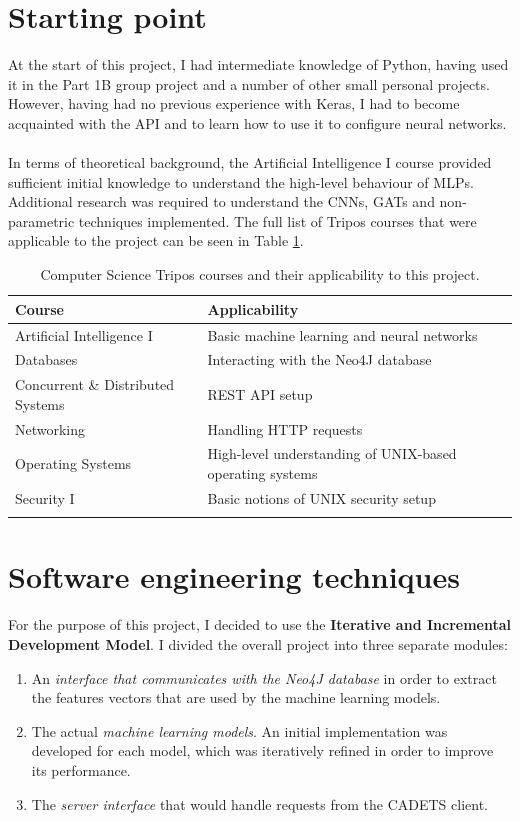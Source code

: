 	\section{Starting point} \label{Section 2.6}
	At the start of this project, I had intermediate knowledge of Python, having used it in the Part 1B group project and a number of other small personal projects. However, having had no previous experience with Keras, I had to become acquainted with the API and to learn how to use it to configure neural networks.   
	\\ \\
	In terms of theoretical background, the Artificial Intelligence I course provided sufficient initial knowledge to understand the high-level behaviour of MLPs. Additional research was required to understand the CNNs, GATs and non-parametric techniques implemented. The full list of Tripos courses that were applicable to the project can be seen in Table \ref{Table 2.4}.
	
	\begin{longtable}{|p{} | p{}|}
		\textbf{Course} & \textbf{Applicability} \\ 
		\hline
		Artificial Intelligence I & Basic machine learning and neural networks \\
		Databases & Interacting with the Neo4J database \\
		Concurrent \& Distributed Systems & REST API setup \\ 
		Networking & Handling HTTP requests \\
		Operating Systems & High-level understanding of UNIX-based operating systems\\
		Security I & Basic notions of UNIX security setup \\
		\hline
		\caption[Computer Science Tripos courses and their applicability to this project.]{\centering Computer Science Tripos courses and their applicability to this project.}
		\label{Table 2.4}
	\end{longtable}
	
	\section{Software engineering techniques} \label{Section 2.7}
	For the purpose of this project, I decided to use the \textbf{Iterative and Incremental Development Model}. I divided the overall project into three separate modules: 
	\begin{enumerate}
		\item An \textit{interface that communicates with the Neo4J database} in order to extract the features vectors that are used by the machine learning models.
		\item The actual \textit{machine learning models}. 	An initial implementation was developed for each model, which was iteratively refined in order to improve its performance.  
		\item The \textit{server interface} that would handle requests from the CADETS client.
	\end{enumerate}

